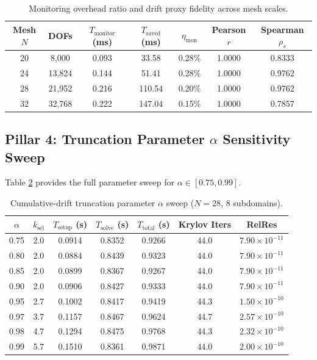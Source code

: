 \documentclass[11pt,a4paper]{article}
\begin{document}
\begin{table}[htbp]
\centering
\small
\caption{Monitoring overhead ratio and drift proxy fidelity across mesh scales.}
\label{tab:supp_p3}
\begin{tabular}{ccccccc}
\toprule
Mesh $N$ & DOFs & $T_{\text{monitor}}$ (ms) & $T_{\text{saved}}$ (ms) & $\eta_{\text{mon}}$ & Pearson $r$ & Spearman $\rho_s$ \\
\midrule
20 & 8,000  & 0.093 & 33.58  & 0.28\% & 1.0000 & 0.8333 \\
24 & 13,824 & 0.144 & 51.41  & 0.28\% & 1.0000 & 0.9762 \\
28 & 21,952 & 0.216 & 110.54 & 0.20\% & 1.0000 & 0.9762 \\
32 & 32,768 & 0.222 & 147.04 & 0.15\% & 1.0000 & 0.7857 \\
\bottomrule
\end{tabular}
\end{table}

\subsection{Pillar 4: Truncation Parameter $\alpha$ Sensitivity Sweep}
Table \ref{tab:supp_p4} provides the full parameter sweep for $\alpha \in [0.75, 0.99]$.

\begin{table}[htbp]
\centering
\small
\caption{Cumulative-drift truncation parameter $\alpha$ sweep ($N=28$, 8 subdomains).}
\label{tab:supp_p4}
\begin{tabular}{ccccccc}
\toprule
$\alpha$ & $k_{\text{sel}}$ & $T_{\text{setup}}$ (s) & $T_{\text{solve}}$ (s) & $T_{\text{total}}$ (s) & Krylov Iters & RelRes \\
\midrule
0.75 & 2.0 & 0.0914 & 0.8352 & 0.9266 & 44.0 & $7.90 \times 10^{-11}$ \\
0.80 & 2.0 & 0.0884 & 0.8439 & 0.9323 & 44.0 & $7.90 \times 10^{-11}$ \\
0.85 & 2.0 & 0.0899 & 0.8367 & 0.9267 & 44.0 & $7.90 \times 10^{-11}$ \\
0.90 & 2.0 & 0.0906 & 0.8427 & 0.9333 & 44.0 & $7.90 \times 10^{-11}$ \\
0.95 & 2.7 & 0.1002 & 0.8417 & 0.9419 & 44.3 & $1.50 \times 10^{-10}$ \\
0.97 & 3.7 & 0.1157 & 0.8467 & 0.9624 & 44.7 & $2.57 \times 10^{-10}$ \\
0.98 & 4.7 & 0.1294 & 0.8475 & 0.9768 & 44.3 & $2.32 \times 10^{-10}$ \\
0.99 & 5.7 & 0.1510 & 0.8361 & 0.9871 & 44.0 & $2.00 \times 10^{-10}$ \\
\bottomrule
\end{tabular}
\end{table}
\end{document}
